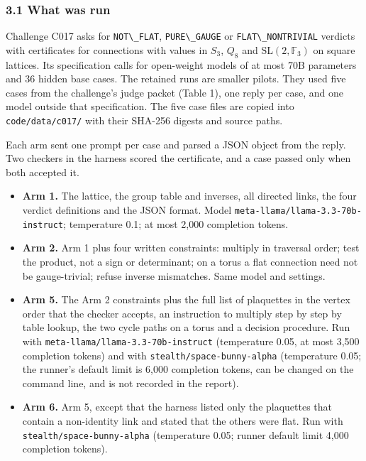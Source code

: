 \documentclass[
  11pt,
]{article}
\newcommand{\passthrough}[1]{#1}
\providecommand{\tightlist}{%
  \setlength{\itemsep}{0pt}\setlength{\parskip}{0pt}}
\begin{document}
\subsubsection{3.1 What was run}\label{what-was-run}

Challenge C017 asks for \passthrough{\lstinline!NOT\_FLAT!},
\passthrough{\lstinline!PURE\_GAUGE!} or
\passthrough{\lstinline!FLAT\_NONTRIVIAL!} verdicts with certificates
for connections with values in \(S_3\), \(Q_8\) and
\(\mathrm{SL}(2, \mathbb{F}_3)\) on square lattices. Its specification
calls for open-weight models of at most 70B parameters and 36 hidden
base cases. The retained runs are smaller pilots. They used five cases
from the challenge's judge packet (Table 1), one reply per case, and one
model outside that specification. The five case files are copied into
\passthrough{\lstinline!code/data/c017/!} with their SHA-256 digests and
source paths.

Each arm sent one prompt per case and parsed a JSON object from the
reply. Two checkers in the harness scored the certificate, and a case
passed only when both accepted it.

\begin{itemize}
\tightlist
\item
  \textbf{Arm 1.} The lattice, the group table and inverses, all
  directed links, the four verdict definitions and the JSON format.
  Model \nolinkurl{meta-llama/llama-3.3-70b-instruct}; temperature 0.1;
  at most 2,000 completion tokens.
\item
  \textbf{Arm 2.} Arm 1 plus four written constraints: multiply in
  traversal order; test the product, not a sign or determinant; on a
  torus a flat connection need not be gauge-trivial; refuse inverse
  mismatches. Same model and settings.
\item
  \textbf{Arm 5.} The Arm 2 constraints plus the full list of plaquettes
  in the vertex order that the checker accepts, an instruction to
  multiply step by step by table lookup, the two cycle paths on a torus
  and a decision procedure. Run with
  \nolinkurl{meta-llama/llama-3.3-70b-instruct} (temperature 0.05, at
  most 3,500 completion tokens) and with
  \nolinkurl{stealth/space-bunny-alpha} (temperature 0.05; the runner's
  default limit is 6,000 completion tokens, can be changed on the
  command line, and is not recorded in the report).
\item
  \textbf{Arm 6.} Arm 5, except that the harness listed only the
  plaquettes that contain a non-identity link and stated that the others
  were flat. Run with \nolinkurl{stealth/space-bunny-alpha} (temperature
  0.05; runner default limit 4,000 completion tokens).
\end{itemize}
\end{document}
